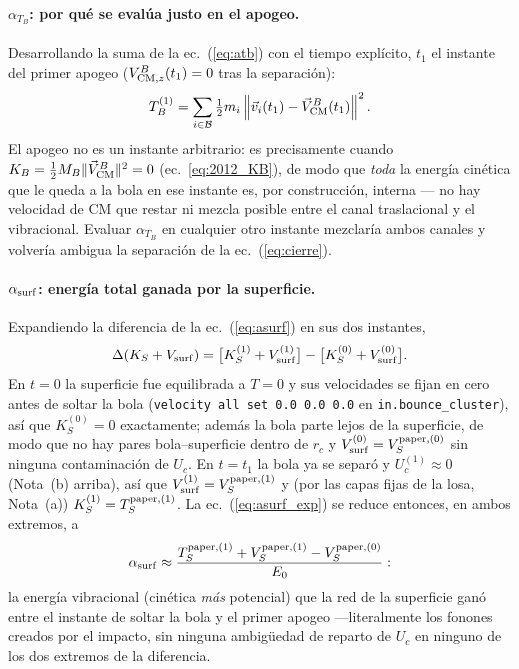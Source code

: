 \documentclass[11pt,a4paper]{article}
\begin{document}
\paragraph{$\alpha_{T_B}$: por qué se evalúa justo en el apogeo.}
Desarrollando la suma de la ec.~(\ref{eq:atb}) con el tiempo explícito,
$t_1$ el instante del primer apogeo ($V_{{\rm CM},z}^B(t_1)=0$ tras la
separación):
\begin{equation}
T_B^{(1)} = \sum_{i\in\mathcal B}\tfrac12 m_i
\left\|\vec v_i(t_1)-\vec V_{\rm CM}^B(t_1)\right\|^2.
\label{eq:TB1_exp}
\end{equation}
El apogeo no es un instante arbitrario: es precisamente cuando
$K_B=\tfrac12M_B\|\vec V_{\rm CM}^B\|^2=0$ (ec.~\ref{eq:2012_KB}), de modo
que \emph{toda} la energía cinética que le queda a la bola en ese instante
es, por construcción, interna --- no hay velocidad de CM que restar ni
mezcla posible entre el canal traslacional y el vibracional. Evaluar
$\alpha_{T_B}$ en cualquier otro instante mezclaría ambos canales y
volvería ambigua la separación de la ec.~(\ref{eq:cierre}).

\paragraph{$\alpha_{\rm surf}$: energía total ganada por la superficie.}
Expandiendo la diferencia de la ec.~(\ref{eq:asurf}) en sus dos instantes,
\begin{equation}
\Delta(K_S+V_{\rm surf}) =
\big[K_S^{(1)}+V_{\rm surf}^{(1)}\big] -
\big[K_S^{(0)}+V_{\rm surf}^{(0)}\big].
\label{eq:asurf_exp}
\end{equation}
En $t=0$ la superficie fue equilibrada a $T=0$ y sus velocidades se fijan
en cero antes de soltar la bola (\texttt{velocity all set 0.0 0.0 0.0} en
\texttt{in.bounce\_cluster}), así que $K_S^{(0)}=0$ exactamente; además la
bola parte lejos de la superficie, de modo que no hay pares
bola--superficie dentro de $r_c$ y $V_{\rm surf}^{(0)}=V_S^{{\rm
paper},(0)}$ sin ninguna contaminación de $U_c$. En $t=t_1$ la bola ya se
separó y $U_c^{(1)}\approx0$ (Nota~(b) arriba), así que
$V_{\rm surf}^{(1)}=V_S^{{\rm paper},(1)}$ y (por las capas fijas de la
losa, Nota~(a)) $K_S^{(1)}=T_S^{{\rm paper},(1)}$. La ec.~(\ref{eq:asurf_exp})
se reduce entonces, en ambos extremos, a
\begin{equation}
\alpha_{\rm surf}\approx\frac{T_S^{{\rm paper},(1)}
+V_S^{{\rm paper},(1)}-V_S^{{\rm paper},(0)}}{E_0}:
\label{eq:asurf_final}
\end{equation}
la energía vibracional (cinética \emph{más} potencial) que la red de la
superficie ganó entre el instante de soltar la bola y el primer apogeo
---literalmente los fonones creados por el impacto, sin ninguna
ambigüedad de reparto de $U_c$ en ninguno de los dos extremos de la
diferencia.
\end{document}
